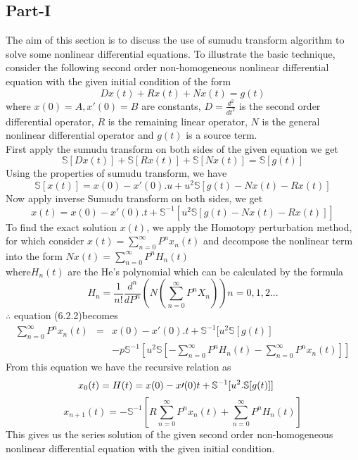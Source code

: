 \subsection{Part-I}
The aim of this section is to discuss the use of sumudu transform algorithm to solve some nonlinear differential equations. To illustrate the basic technique, consider the following second order non-homogeneous nonlinear differential equation with the given initial condition of the form
 \begin{equation}
    Dx(t) + Rx(t) + Nx(t) = g(t)     
\end{equation}
where $ x(0) = A, x\prime(0)=B  $ are constants, $D=\frac{d^{2}}{dt^{2}}$ is the second order differential operator, $R$ is the remaining linear operator, $N$ is the general nonlinear differential operator and $g(t)$ is a source term.\\
First apply the sumudu transform on both sides of the given equation we get
\begin{equation*}
   \mathbb{S}[ Dx(t)] +\mathbb{S} [Rx(t)] + \mathbb{S}[Nx(t)] = \mathbb{S}[g(t) ]    
\end{equation*}      
Using the properties of sumudu transform, we have
\begin{equation*}
\mathbb{S}[ x(t)] =x(0)-x\prime(0).u+ u^2\mathbb{S} [g(t) - Nx(t) - Rx(t) ]
\end{equation*}
Now apply inverse Sumudu transform on both sides, we get
\begin{equation}
 x(t) =x(0)-x\prime(0).t+\mathbb{S}^{-1}[ u^2\mathbb{S} [g(t) - Nx(t) - Rx(t) ]]
\end{equation}
To find the exact solution $x(t)$, we apply the Homotopy perturbation method, for which consider $ x(t)={\sum_{n=0}^{\infty} P^{n}x_{n}(t)} $ and decompose the nonlinear term into the form $ Nx(t) ={\sum_{n=0}^{\infty} P^{n}H_{n}(t)} $\\
where$ H_{n}(t)$ are the He's polynomial which can be calculated by the formula
\begin{equation}
{  H_{n} = \frac{1}{n!}\frac{d^n}{dP^n}(N(\sum_{n=0}^{\infty} P^nX_{n}))}      n = 0,1,2...
 \end{equation}
$\therefore$ equation (6.2.2)becomes
\begin{eqnarray*}
{\sum_{n=0}^{\infty} P^{n}x_{n}(t)}&=&x(0)-x\prime(0).t+\mathbb{S}^{-1}[ u^2\mathbb{S} [g(t)]\\
&&-p\mathbb{S}^{-1}[ u^2\mathbb{S} [ - {\sum_{n=0}^{\infty} P^{n}H_{n}(t)} - \sum_{n=0}^{\infty} P^{n}x_{n}(t) ]]
\end{eqnarray*}
From this equation we have the recursive relation as
\begin{equation}
x_{0}(t)=H(t)=x(0)-x\prime(0)t+\mathbb{S}^{-1}[u^2.\mathbb{S}[g(t)]] {\hspace{0.5cm}}
\end{equation}
 \begin{equation}
x_{n+1}(t)=-\mathbb{S}^{-1}[R\sum_{n=0}^{\infty} P^{n}x_{n}(t)+{\sum_{n=0}^{\infty} P^{n}H_{n}(t)}  ]
\end{equation}
This gives us the series solution of the given second order non-homogeneous nonlinear differential equation with the given initial condition.
